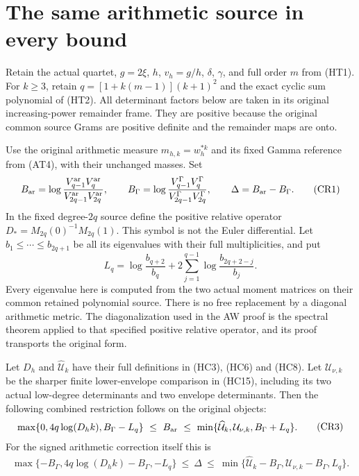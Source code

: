 \section{The same arithmetic source in every bound}

Retain the actual quartet, $g=2\xi$, $h$, $v_h=g/h$, $\delta$, $\gamma$,
and full order $m$ from (HT1). For $k\ge3$, retain
$q=[1+k(m-1)](k+1)^2$ and the exact cyclic sum polynomial of (HT2).
All determinant factors below are taken in its original increasing-power
remainder frame. They are positive because the original common source
Grams are positive definite and the remainder maps are onto.

Use the original arithmetic measure $m_{h,k}=w_h^{*k}$ and its fixed
Gamma reference from (AT4), with their unchanged masses. Set
\[
 B_{\rm ar}=\log\frac{V^{\rm ar}_{q-1}V^{\rm ar}_q}
 {V^{\rm ar}_{2q-1}V^{\rm ar}_{2q}},\qquad
 B_\Gamma=\log\frac{V^\Gamma_{q-1}V^\Gamma_q}
 {V^\Gamma_{2q-1}V^\Gamma_{2q}},\qquad
 \Delta=B_{\rm ar}-B_\Gamma.                         \tag{CR1}
\]
In the fixed degree-$2q$ source define the positive relative operator
$D_*=M_{2q}(0)^{-1}M_{2q}(1)$. This symbol is not the Euler differential.
Let $b_1\le\cdots\le b_{2q+1}$ be all its eigenvalues with their full
multiplicities, and put
\[
 L_q=\log\frac{b_{q+2}}{b_q}
 +2\sum_{j=1}^{q-1}\log\frac{b_{2q+2-j}}{b_j}.          \tag{CR2}
\]
Every eigenvalue here is computed from the two actual moment matrices
on their common retained polynomial source. There is no free replacement
by a diagonal arithmetic metric. The diagonalization used in the AW proof
is the spectral theorem applied to that specified positive relative
operator, and its proof transports the original form.

Let $D_h$ and $\widehat{\mathcal U}_k$ have their full definitions in
(HC3), (HC6) and (HC8). Let $\mathcal U_{\nu,k}$ be the sharper finite
lower-envelope comparison in (HC15), including its two actual low-degree
determinants and two envelope determinants. Then the following combined
restriction follows on the original objects:
\[
\begin{split}
\max\{0,4q\log(D_hk),B_\Gamma-L_q\}
\ \le\ B_{\rm ar}\ \le\
\min\{\widehat{\mathcal U}_k,\mathcal U_{\nu,k},B_\Gamma+L_q\}.
\end{split}                                                   \tag{CR3}
\]
For the signed arithmetic correction itself this is
\[
\begin{split}
\max\{-B_\Gamma,4q\log(D_hk)-B_\Gamma,-L_q\}
\ \le\ \Delta\ \le\
\min\{\widehat{\mathcal U}_k-B_\Gamma,
       \mathcal U_{\nu,k}-B_\Gamma,L_q\}.
\end{split}                                                   \tag{CR4}
\]

